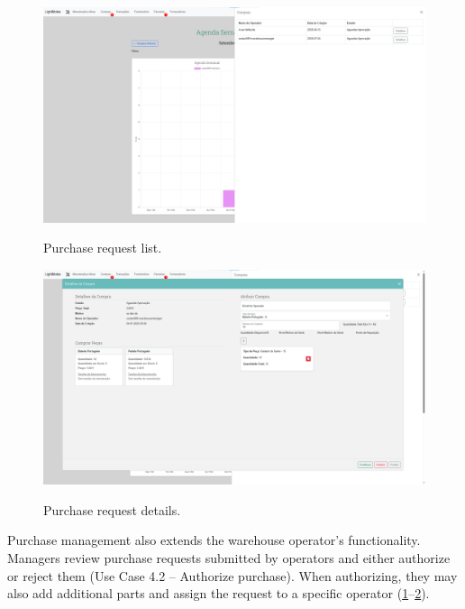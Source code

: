 \begin{figure}[h]
  \caption{Purchase request list.}
  \centering
  \includegraphics[width=\textwidth]{figs/Implementation/workshopmanager/purchaseList}
  \label{fig:workshopmanagerPurchaseList}
\end{figure}



\begin{figure}[h]
  \caption{Purchase request details.}
  \centering
  \includegraphics[width=\textwidth]{figs/Implementation/workshopmanager/purchaseDetails}
  \label{fig:workshopmanagerPurchaseDetails}
\end{figure}

Purchase management also extends the warehouse operator's functionality. Managers review purchase requests submitted by operators and either authorize or reject them (Use Case 4.2 – Authorize purchase). When authorizing, they may also add additional parts and assign the request to a specific operator (\ref{fig:workshopmanagerPurchaseList}–\ref{fig:workshopmanagerPurchaseDetails}).


